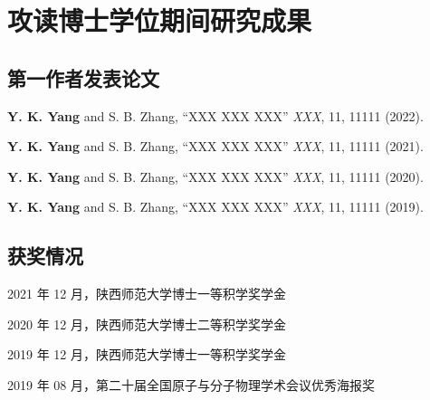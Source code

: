
\chapter{攻读博士学位期间研究成果}


\section*{第一作者发表论文} %




\begin{enumerate}[label = {[\arabic*]}]
    \addtolength{\itemsep}{-.36\baselineskip}%
    \item \textbf{Y. K. Yang} and S. B. Zhang, “XXX XXX XXX”
    \textit{XXX}, 11, 11111 (2022).
    \item \textbf{Y. K. Yang} and S. B. Zhang, “XXX XXX XXX”
    \textit{XXX}, 11, 11111 (2021).
    \item \textbf{Y. K. Yang} and S. B. Zhang, “XXX XXX XXX”
    \textit{XXX}, 11, 11111 (2020).
    \item \textbf{Y. K. Yang} and S. B. Zhang, “XXX XXX XXX”
    \textit{XXX}, 11, 11111 (2019).
\end{enumerate}








\section*{获奖情况} %

\begin{enumerate}[label = {[\arabic*]}]
    \addtolength{\itemsep}{-.36\baselineskip}%
    \item 2021 年 12 月，陕西师范大学博士一等积学奖学金 \par
    \item 2020 年 12 月，陕西师范大学博士二等积学奖学金 \par
    \item 2019 年 12 月，陕西师范大学博士一等积学奖学金 \par
    \item 2019 年 08 月，第二十届全国原子与分子物理学术会议优秀海报奖 \par
\end{enumerate}







